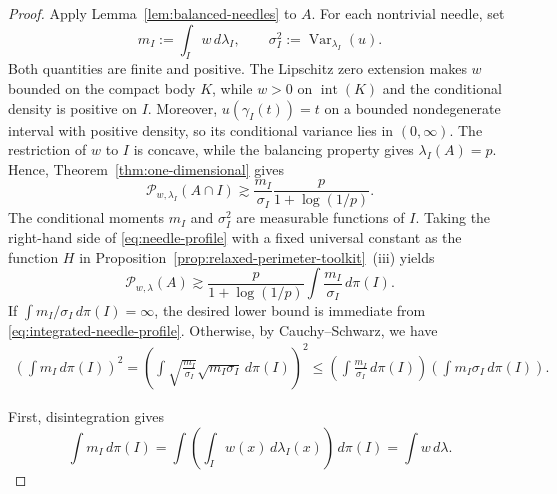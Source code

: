 \documentclass[11pt]{article}
\theoremstyle{definition}
\theoremstyle{remark}
\newcommand{\cP}{\mathcal P}
\begin{document}
\begin{proof}
Apply Lemma~\ref{lem:balanced-needles} to $A$.  For each nontrivial needle, set
\[
 m_I:=\int_Iw\,d\lambda_I,
 \qquad
 \sigma_I^2:=\operatorname{Var}_{\lambda_I}(u).
\]
Both quantities are finite and positive.  The Lipschitz zero extension makes
$w$ bounded on the compact body $K$, while $w>0$ on ${\operatorname{int}(K)}$ and the
conditional density is positive on $I$.  Moreover,
$u(\gamma_I(t))=t$ on a bounded nondegenerate interval with positive
density, so its conditional variance lies in $(0,\infty)$.  The restriction
of $w$ to $I$ is concave, while the balancing
property gives $\lambda_I(A)=p$.  Hence,
Theorem~\ref{thm:one-dimensional} gives
\begin{equation}\label{eq:needle-profile}
 \cP_{w,\lambda_I}(A\cap I)
 \gtrsim
 \frac{m_I}{\sigma_I}
 \frac{p}{1+\log(1/p)}.
\end{equation}
The conditional moments $m_I$ and $\sigma_I^2$ are measurable functions of
$I$.  Taking the right-hand side of \eqref{eq:needle-profile} with a fixed
universal constant as the function $H$ in Proposition~\ref{prop:relaxed-perimeter-toolkit}~\textup{(iii)} yields
\begin{equation}\label{eq:integrated-needle-profile}
 \cP_{w,\lambda}(A)
 \gtrsim
 \frac{p}{1+\log(1/p)}
 \int\frac{m_I}{\sigma_I}\,d\pi(I).
\end{equation}
If \(\int m_I/\sigma_I\,d\pi(I)=\infty\), the desired lower bound is
immediate from \eqref{eq:integrated-needle-profile}.  Otherwise, by Cauchy--Schwarz, we have
\begin{align}\label{eq:mI_sigmaI_ratio}
    \left(\int m_I\,d\pi(I)\right)^2=\left(\int\sqrt{\frac{m_I}{\sigma_I}}\sqrt{m_I\sigma_I}\,d\pi(I)\right)^2\le\left(\int\frac{m_I}{\sigma_I}\,d\pi(I)\right)\left(\int m_I\sigma_I\,d\pi(I)\right).
\end{align}

First, disintegration gives
\begin{equation}\label{eq:mean-needle-weight}
 \int m_I\,d\pi(I)=\int \left(\int_I w(x)\,d\lambda_I(x)\right)\,d\pi(I)=\int w\,d\lambda.
\end{equation}


\end{proof}
\end{document}
